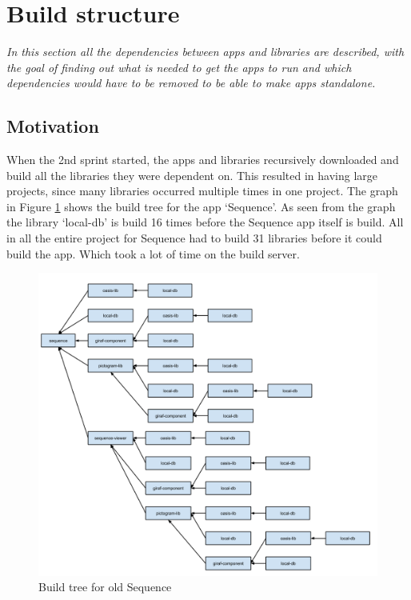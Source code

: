 \section{Build structure}
\label{Sprint2_buildstructure}
\textit{In this section all the dependencies between apps and libraries are described, with the goal of finding out what is needed to get the apps to run and which dependencies would have to be removed to be able to make apps standalone.}

\subsection{Motivation}

When the 2nd sprint started, the apps and libraries recursively downloaded and build all the libraries they were dependent on. This resulted in having large projects, since many libraries occurred multiple times in one project. The graph in Figure \ref{oldbuild} shows the build tree for the app ‘Sequence’. As seen from the graph the library ‘local-db’ is build 16 times before the Sequence app itself is build. All in all the entire project for Sequence had to build 31 libraries before it could build the app. Which took a lot of time on the build server.

\begin{figure}[H]
	\centering
	\includegraphics[width=0.8 \textwidth]{pictures/oldbuild.png}
	\caption{Build tree for old Sequence}
	\label{oldbuild}
\end{figure}

